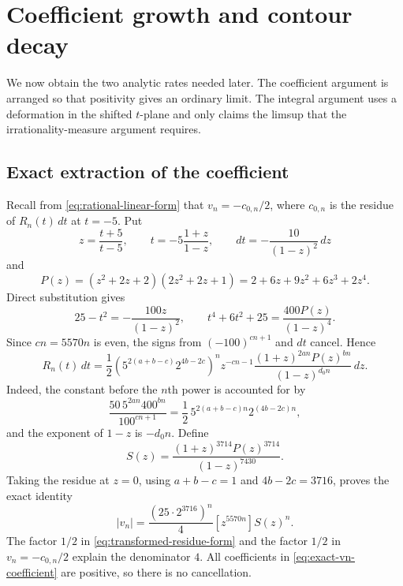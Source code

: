 \documentclass[11pt,reqno,letterpaper]{amsart}
\numberwithin{equation}{section}
\theoremstyle{definition}
\theoremstyle{remark}
\begin{document}
\section{Coefficient growth and contour decay}\label{sec:asymptotics}

We now obtain the two analytic rates needed later.  The coefficient
argument is arranged so that positivity gives an ordinary limit.  The
integral argument uses a deformation in the shifted \(t\)-plane and only
claims the limsup that the irrationality-measure argument requires.

\subsection{Exact extraction of the coefficient}

Recall from \eqref{eq:rational-linear-form} that
\(v_n=-c_{0,n}/2\), where \(c_{0,n}\) is the residue of \(R_n(t)\,dt\)
at \(t=-5\).  Put
\begin{equation}\label{eq:mobius-z-change}
 z=\frac{t+5}{t-5},\qquad
 t=-5\frac{1+z}{1-z},\qquad
 dt=-\frac{10}{(1-z)^2}\,dz
\end{equation}
and
\begin{equation}\label{eq:positive-P-polynomial}
 P(z)=(z^2+2z+2)(2z^2+2z+1)
     =2+6z+9z^2+6z^3+2z^4.
\end{equation}
Direct substitution gives
\[
 25-t^2=-\frac{100z}{(1-z)^2},\qquad
 t^4+6t^2+25=\frac{400P(z)}{(1-z)^4}.
\]
Since \(cn=5570n\) is even, the signs from
\((-100)^{cn+1}\) and \(dt\) cancel.  Hence
\begin{equation}\label{eq:transformed-residue-form}
 R_n(t)\,dt
 =\frac12
 \left(5^{2(a+b-c)}2^{4b-2c}\right)^n
 z^{-cn-1}\frac{(1+z)^{2an}P(z)^{bn}}
 {(1-z)^{d_0n}}\,dz.
\end{equation}
Indeed, the constant before the \(n\)th power is accounted for by
\[
 \frac{50\,5^{2an}400^{bn}}{100^{cn+1}}
 =\frac12\,5^{2(a+b-c)n}2^{(4b-2c)n},
\]
and the exponent of \(1-z\) is \(-d_0n\).  Define
\begin{equation}\label{eq:positive-S-function}
 S(z)=\frac{(1+z)^{3714}P(z)^{3714}}{(1-z)^{7430}}.
\end{equation}
Taking the residue at \(z=0\), using \(a+b-c=1\) and
\(4b-2c=3716\), proves the exact identity
\begin{equation}\label{eq:exact-vn-coefficient}
 \boxed{
 |v_n|=\frac{(25\cdot2^{3716})^n}{4}
 [z^{5570n}]S(z)^n.}
\end{equation}
The factor \(1/2\) in \eqref{eq:transformed-residue-form} and the factor
\(1/2\) in \(v_n=-c_{0,n}/2\) explain the denominator \(4\).
All coefficients in \eqref{eq:exact-vn-coefficient} are positive, so
there is no cancellation.
\end{document}

